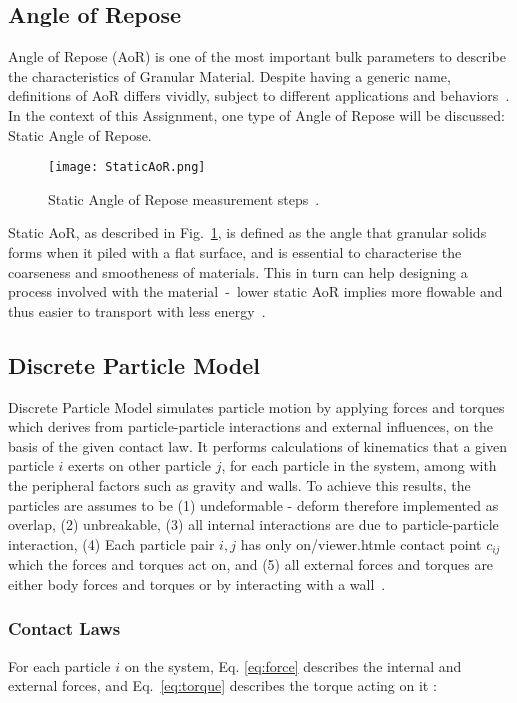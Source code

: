 \subsection{Angle of Repose}
Angle of Repose (AoR) is one of the most important bulk parameters to describe the characteristics of Granular Material. Despite having a generic name, definitions of AoR differs vividly, subject to different applications and behaviors~\cite{BEAKAWIALHASHEMI2018397}. In the context of this Assignment, one type of Angle of Repose will be discussed: Static Angle of Repose. 

\begin{figure}[H]
    \centering
    \texttt{[image: StaticAoR.png]}
    \caption{Static Angle of Repose measurement steps~\cite{Rackl:2018te}.}\label{fig:StaticAoR}
\end{figure}


Static AoR, as described in Fig.~\ref{fig:StaticAoR}, is defined as the angle that granular solids forms when it piled with a flat surface, and is essential to characterise the coarseness and smootheness of materials. This in turn can help designing a process involved with the material~-~lower static AoR implies more flowable and thus easier to transport with less energy~\cite{TEFERRA201945}. 


 \subsection{Discrete Particle Model}
 Discrete Particle Model simulates particle motion by applying forces and torques which derives from particle-particle interactions and external influences, on the basis of the given contact law. It performs calculations of kinematics that a given particle $i$ exerts on other particle $j$, for each particle in the system, among with the peripheral factors such as gravity and walls. To achieve this results, the particles are assumes to be (1) undeformable - deform therefore implemented as overlap, (2) unbreakable, (3) all internal interactions are due to particle-particle interaction, (4) Each particle pair $i, j$ has only on/viewer.htmle contact point $c_{ij}$ which the forces and torques act on, and (5) all external forces and torques are either body forces and torques or by interacting with a wall~\cite{MercuryDPM}. 

\subsubsection{Contact Laws}
For each particle $i$ on the system, Eq. \ref{eq:force} describes the internal and external forces, and Eq.~\ref{eq:torque} describes the torque acting on it \cite{MercuryDPM}:

